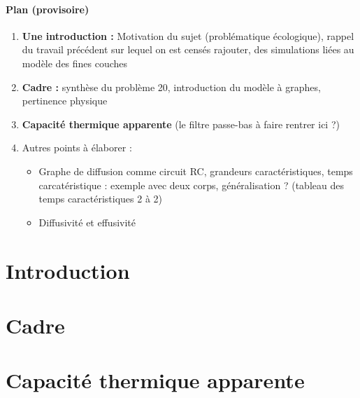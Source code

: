 \documentclass[11pt]{article}
\begin{document}



\tableofcontents

\newpage

\paragraph{Plan (provisoire)}
\begin{enumerate}
    \item \textbf{Une introduction :} Motivation du sujet (problématique écologique), rappel du travail précédent sur lequel on est censés rajouter, des simulations liées au modèle des fines couches
    \item \textbf{Cadre :} synthèse du problème 20, introduction du modèle à graphes, pertinence physique 
    \item \textbf{Capacité thermique apparente} (le filtre passe-bas à faire rentrer ici ?)
    \item Autres points à élaborer : 
    \begin{itemize}
        \item Graphe de diffusion comme circuit RC, grandeurs caractéristiques, temps carcatéristique : exemple avec deux corps, généralisation ? (tableau des temps caractéristiques 2 à 2)
        \item Diffusivité et effusivité
    \end{itemize}
\end{enumerate}

\newpage


\section*{Introduction}



\newpage






\section{Cadre} %

\newpage 



\section{Capacité thermique apparente}

\newpage


\end{document}
